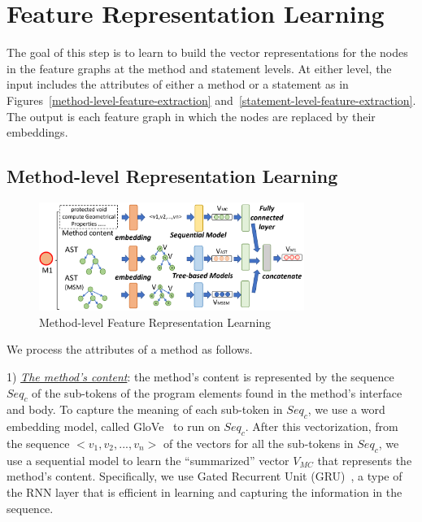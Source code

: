 \section{Feature Representation Learning}
\label{feature-learning:sec}

The goal of this step is to learn to build the vector representations
for the nodes in the feature graphs at the method and statement levels.
At either level, the input includes the attributes of either a method
or a statement as in Figures~\ref{method-level-feature-extraction}
and~\ref{statement-level-feature-extraction}. The output is each
feature graph in which the nodes are replaced by their embeddings.



\subsection{Method-level Representation Learning}

\begin{figure}[t]
	\centering
	\includegraphics[width=3.4in]{graphs/step-2-method-new.png}
	\caption{Method-level Feature Representation Learning}
	\label{method-level-feature-learning}
\end{figure}


We process the attributes of a method as follows.

1) {\em \underline{The method's content}}: the method's content is
represented by the sequence $Seq_c$ of the sub-tokens of the program
elements found in the method's interface and body. To capture the
meaning of each sub-token in $Seq_c$, we use a word embedding model,
called GloVe~\cite{glove2014} to run on $Seq_c$. After this
vectorization, from the sequence $<v_1,v_2, ..., v_n>$ of the vectors
for all the sub-tokens in $Seq_c$, we use a sequential model to learn
the ``summarized'' vector $V_{MC}$ that represents the method's
content. Specifically, we use Gated Recurrent Unit
(GRU)~\cite{cho2014learning}, a type of the RNN layer that is efficient in
learning and capturing the information in the sequence.

